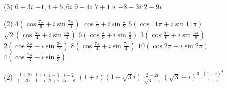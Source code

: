 \documentclass[12pt,a4paper]{article}
\begin{document}
\begin{exercise}
        \begin{tasks}(3)
            \task $6+3i$
            \task $-1{,}4+5{,}6i$
            \task $9-4i$
            \task $7+11i$
            \task $-8-3i$
            \task $2-9i$
        \end{tasks}
\end{exercise}


\begin{exercise}
    \begin{tasks}(2)
        \task $\displaystyle 4\left(\cos\frac{7\pi}{6}+i\sin\frac{7\pi}{6}\right)$
        \task $\displaystyle \cos\frac{\pi}{2}+i\sin\frac{\pi}{2}$
        \task $5(\cos11\pi+i\sin11\pi)$
        \task $\displaystyle \sqrt2\left(\cos\frac{5\pi}{4}+i\sin\frac{5\pi}{4}\right)$
        \task $\displaystyle 6\left(\cos\frac{\pi}{3}+i\sin\frac{\pi}{3}\right)$
        \task $\displaystyle 3\left(\cos\frac{5\pi}{6}+i\sin\frac{5\pi}{6}\right)$
        \task $\displaystyle 2\left(\cos\frac{3\pi}{2}+i\sin\frac{3\pi}{2}\right)$
        \task $\displaystyle 8\left(\cos\frac{7\pi}{4}+i\sin\frac{7\pi}{4}\right)$
        \task $\displaystyle 10(\cos2\pi+i\sin2\pi)$
        \task $\displaystyle 4\left(\cos\frac{2\pi}{3}-i\sin\frac{\pi}{3}\right)$
    \end{tasks}
\end{exercise}


\begin{exercise}
    \begin{tasks}(2)
        \task $\displaystyle \frac{-1+2i}{1+3i}$
        \task $\displaystyle \frac{1+i}{1-i}$
        \task $\displaystyle \frac{i-3}{2+i}$
        \task $\displaystyle \frac{i-2}{4i-8}$
        \task $(1+i)(1+\sqrt3 i)$
        \task $\displaystyle \frac{2-2i}{\sqrt3+i}$
        \task $(\sqrt3+i)^3$
        \task $\displaystyle \frac{(1+i)^4}{1-i}$
    \end{tasks}
\end{exercise}
\end{document}
